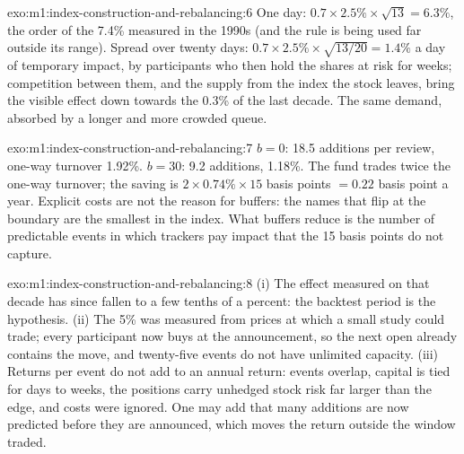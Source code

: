 \begin{solution}{exo:m1:index-construction-and-rebalancing:6}
One day: $0.7 \times 2.5\% \times \sqrt{13} = 6.3\%$, the order of the 7.4\%
measured in the 1990s (and the rule is being used far outside its range).
Spread over twenty days: $0.7 \times 2.5\% \times \sqrt{13/20} = 1.4\%$ a day
of temporary impact, by participants who then hold the shares at risk for
weeks; competition between them, and the supply from the index the stock
leaves, bring the visible effect down towards the 0.3\% of the last decade.
The same demand, absorbed by a longer and more crowded queue.
\end{solution}

\begin{solution}{exo:m1:index-construction-and-rebalancing:7}
$b = 0$: 18.5 additions per review, one-way turnover 1.92\%. $b = 30$: 9.2
additions, 1.18\%. The fund trades twice the one-way turnover; the saving is
$2 \times 0.74\% \times 15$ basis points $= 0.22$ basis point a year.
Explicit costs are not the reason for buffers: the names that flip at the
boundary are the smallest in the index. What buffers reduce is the number of
predictable events in which trackers pay impact that the 15 basis points do
not capture.
\end{solution}

\begin{solution}{exo:m1:index-construction-and-rebalancing:8}
(i) The effect measured on that decade has since fallen to a few tenths of a
percent: the backtest period is the hypothesis. (ii) The 5\% was measured
from prices at which a small study could trade; every participant now buys
at the announcement, so the next open already contains the move, and
twenty-five events do not have unlimited capacity. (iii) Returns per event
do not add to an annual return: events overlap, capital is tied for days to
weeks, the positions carry unhedged stock risk far larger than the edge, and
costs were ignored. One may add that many additions are now predicted
before they are announced, which moves the return outside the window
traded.
\end{solution}

